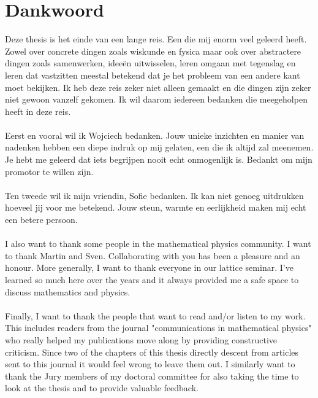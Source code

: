 \chapter*{Dankwoord}                                  \label{ch:preface}

Deze thesis is het einde van een lange reis. Een die mij enorm veel geleerd heeft. Zowel over concrete dingen zoals wiskunde en fysica maar ook over abstractere dingen zoals samenwerken, ideeën uitwisselen, leren omgaan met tegenslag en leren dat vastzitten meestal betekend dat je het probleem van een andere kant moet bekijken. Ik heb deze reis zeker niet alleen gemaakt  en die dingen zijn zeker niet gewoon vanzelf gekomen. Ik wil daarom iedereen bedanken die meegeholpen heeft in deze reis.
\\\\
Eerst en vooral wil ik Wojciech bedanken. Jouw unieke inzichten en manier van nadenken hebben een diepe indruk op mij gelaten, een die ik altijd zal meenemen. Je hebt me geleerd dat iets begrijpen nooit echt onmogenlijk is. Bedankt om mijn promotor te willen zijn.
\\\\
Ten tweede wil ik mijn vriendin, Sofie bedanken. Ik kan niet genoeg uitdrukken hoeveel jij voor me betekend. Jouw steun, warmte en eerlijkheid maken mij echt een betere persoon.
\\\\
I also want to thank some people in the mathematical physics community. I want to thank Martin and Sven. Collaborating with you has been a pleasure and an honour. More generally, I want to thank everyone in our lattice seminar. I've learned so much here over the years and it always provided me a safe space to discuss mathematics and physics.
\\\\
Finally, I want to thank the people that want to read and/or listen to my work. This includes readers from the journal "communications in mathematical physics" who really helped my publications move along by providing constructive criticism. Since two of the chapters of this thesis directly descent from articles sent to this journal it would feel wrong to leave them out. I similarly want to thank the Jury members of my doctoral committee for also taking the time to look at the thesis and to provide valuable feedback.

\instructionspreface


\cleardoublepage

